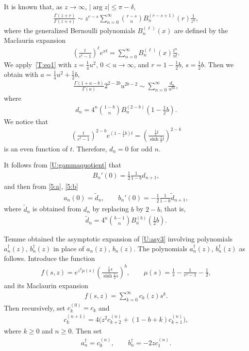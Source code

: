 \documentclass[pdftex]{sigma}
\numberwithin{equation}{section}
\begin{document}
It is known \cite[(5.11.13)]{NIST} that, as $z\to\infty$, $|\arg z|\le \pi-\delta$,
\begin{gather}\label{T:eq1}
\frac{\Gamma(z+r)}{\Gamma(z+s)}\sim z^{r-s}\sum_{n=0}^\infty \binom{r-s}{n} B_n^{(r-s+1)}(r) \frac{1}{z^n},
\end{gather}
where the generalized Bernoulli polynomials $B_n^{(\ell)}(x)$ are def\/ined by the Maclaurin expansion
\begin{gather*} \left(\frac{t}{e^t-1}\right)^\ell e^{xt}=\sum_{n=0}^\infty B_n^{(\ell)}(x)\frac{t^n}{n!} .\end{gather*}
We apply~\eqref{T:eq1} with $z=\frac14u^2$, $0<u\to\infty$, and $r=1-\frac12 b$, $s=\frac12 b$. Then we obtain with $a=\frac14 u^2+\frac12 b$,
\begin{gather*}%
 \frac{\Gamma(1+a-b)}{\Gamma(a)}2^{2-2b}u^{2b-2}\sim \sum_{n=0}^\infty \frac{d_n}{u^{2n}},
\end{gather*}
where
\begin{gather*} d_n=4^n\binom{1-b}{n}B_n^{(2-b)}\left(1-\frac12 b\right) .\end{gather*}
We notice that
\begin{gather*} \left(\frac{t}{e^t-1}\right)^{2-b}e^{(1-\frac12b)t}=\left(\frac{\frac12t}{\sinh \frac12 t}\right)^{2-b} \end{gather*}
is an even function of $t$.
Therefore, $d_n=0$ for odd $n$.

It follows from \eqref{U:gammaquotient} that
\begin{gather*}%
B_n'(0)=\frac12 \frac{1}{1-b}d_{n+1} ,
\end{gather*}
and then from \eqref{5:a}, \eqref{5:b}
\begin{gather}\label{T:eq4}
a_n(0)=\tilde d_n,\qquad b_n'(0)=-\frac12 \frac1{1-b} \tilde d_{n+1} ,
\end{gather}
where $\tilde d_n$ is obtained from $d_n$ by replacing $b$ by $2-b$, that is,
\begin{gather*}
\tilde d_n= 4^n\binom{b-1}{n}B_n^{(b)}\left(\frac12 b\right) .
\end{gather*}

Temme \cite[(3.22)]{T} obtained the asymptotic expansion of \eqref{U:asy3} involving polyno\-mials~$a^\dagger_n(z)$, $b^\dagger_n(z)$ in place of $a_n(z)$, $b_n(z)$.
The polynomials $a_n^\dagger(z)$, $b_n^\dagger(z)$ as follows. Introduce the function
\begin{gather*}
f(s,z)=e^{z^2\mu(s)} \left(\frac{\frac12 s}{\sinh \frac12s}\right)^b,\qquad \mu(s)=\frac1s-\frac{1}{e^s-1}-\frac12 ,
\end{gather*}
and its Maclaurin expansion
\begin{gather*}%
f(s,z)=\sum_{k=0}^\infty c_k(z) s^k .
\end{gather*}
Then recursively, set $c_k^{(0)}=c_k$ and
\begin{gather*}
 c_k^{(n+1)}=4\big(z^2c_{k+2}^{(n)}+(1-b+k)c_{k+1}^{(n)}\big),
\end{gather*}
where $k\ge0 $ and $n\ge 0$.
Then set
\begin{gather*} a_n^\dagger=c_0^{(n)},\qquad b_n^\dagger =-2zc_1^{(n)}.\end{gather*}
\end{document}
